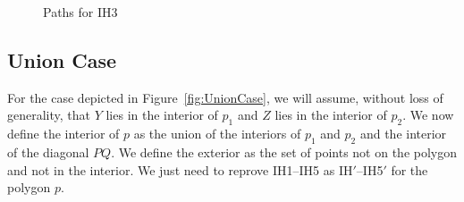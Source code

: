 \begin{figure}
\centering
{}
\caption{Paths for IH3}
\end{figure}

\subsection{Union Case}
For the case depicted in Figure~\ref{fig:UnionCase}, we will assume, without loss of generality, that $Y$ lies in the interior of $p_1$ and $Z$ lies in the interior of $p_2$. We now define the interior of $p$ as the union of the interiors of $p_1$ and $p_2$ and the interior of the diagonal $PQ$. We define the exterior as the set of points not on the polygon and not in the interior. We just need to reprove IH1--IH5 as IH$'$--IH5$'$ for the polygon $p$.


